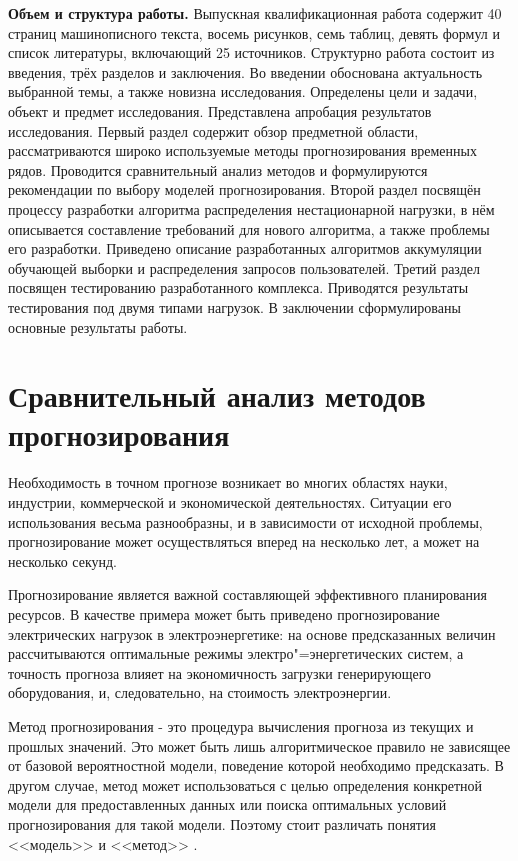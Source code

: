\documentclass[a4paper,14pt,russian]{extreport}
\begin{document}
{\bfseries Объем и структура работы.} 
Выпускная квалификационная работа содержит 40 страниц машинописного 
текста, восемь рисунков, семь таблиц, девять формул и список литературы, 
включающий 25 источников. Структурно работа состоит из введения, трёх 
разделов и заключения. Во введении обоснована актуальность выбранной темы, 
а также новизна исследования. Определены цели и задачи, объект и предмет 
исследования. Представлена апробация результатов исследования. Первый 
раздел содержит обзор предметной области, рассматриваются широко 
используемые методы прогнозирования временных рядов. Проводится 
сравнительный анализ методов и формулируются рекомендации по выбору 
моделей прогнозирования. Второй раздел посвящён процессу разработки 
алгоритма распределения нестационарной нагрузки, в нём описывается 
составление требований для нового алгоритма, а также проблемы его 
разработки. Приведено описание разработанных алгоритмов аккумуляции 
обучающей выборки и распределения запросов пользователей. Третий раздел 
посвящен тестированию разработанного комплекса. Приводятся результаты 
тестирования под двумя типами нагрузок. В заключении сформулированы 
основные результаты работы.

\chapter{Сравнительный анализ методов прогнозирования}
Необходимость в точном прогнозе возникает во многих областях науки, 
индустрии, коммерческой и экономической деятельностях. Ситуации его 
использования весьма разнообразны, и в зависимости от исходной проблемы, 
прогнозирование может осуществляться вперед на несколько лет, а может на 
несколько секунд. 

Прогнозирование является важной составляющей эффективного планирования 
ресурсов. В качестве примера может быть приведено прогнозирование 
электрических нагрузок в электроэнергетике: на основе предсказанных величин 
рассчитываются оптимальные режимы электро"=энергетических систем, а 
точность прогноза влияет на экономичность загрузки генерирующего 
оборудования, и, следовательно, на стоимость электроэнергии.

Метод прогнозирования - это процедура вычисления прогноза из текущих и 
прошлых значений. Это может быть лишь алгоритмическое правило не 
зависящее от базовой вероятностной модели, поведение которой необходимо 
предсказать. В другом случае, метод может использоваться с целью 
определения конкретной модели для предоставленных данных или поиска 
оптимальных условий прогнозирования для такой модели. Поэтому стоит 
различать понятия <<модель>> и <<метод>> \cite{chatfield2000}. 
\end{document}
